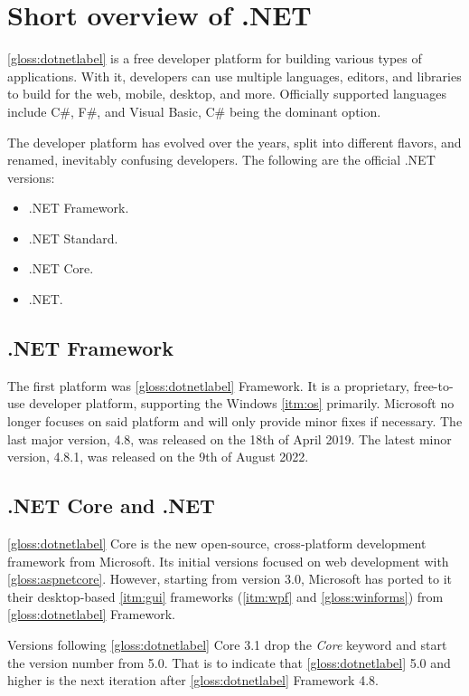 \chapter{Short overview of .NET} \label{chap:overviewNET}
\ref{gloss:dotnetlabel} is a free developer platform for building various types of applications. With it, developers can use multiple languages, editors, and libraries to build for the web, mobile, desktop, and more.
Officially supported languages include C\#, F\#, and Visual Basic, C\# being the dominant option.

The developer platform has evolved over the years, split into different flavors, and renamed, inevitably confusing developers.
The following are the official .NET versions:
\begin{itemize}
    \item .NET Framework.
    \item .NET Standard.
    \item .NET Core.
    \item .NET.
\end{itemize}

\section{.NET Framework} \label{sec:netFramework}

The first platform was \ref{gloss:dotnetlabel} Framework. It is a proprietary, free-to-use developer platform, supporting the Windows \ref{itm:os} primarily. Microsoft no longer focuses on said platform and will only provide minor fixes if necessary. The last major version, 4.8, was released on the 18th of April 2019. The latest minor version, 4.8.1, was released on the 9th of August 2022.

\section{.NET Core and .NET} \label{sec:netCore}

\ref{gloss:dotnetlabel} Core is the new open-source, cross-platform development framework from Microsoft. Its initial versions focused on web development with \ref{gloss:aspnetcore}. However, starting from version 3.0, Microsoft has ported to it their desktop-based \ref{itm:gui} frameworks (\ref{itm:wpf} and \ref{gloss:winforms}) from \ref{gloss:dotnetlabel} Framework.

Versions following \ref{gloss:dotnetlabel} Core 3.1 drop the \textit{Core} keyword and start the version number from 5.0. That is to indicate that \ref{gloss:dotnetlabel} 5.0 and higher is the next iteration after \ref{gloss:dotnetlabel} Framework 4.8.

